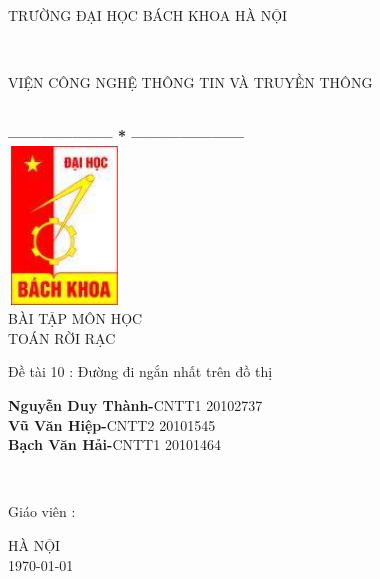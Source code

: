 \documentclass[a4paper,12pt]{report}
\begin{document}
	\thispagestyle{empty}
	\thisfancypage{
		\setlength{\fboxsep}{0pt}
		\fbox}{} 
	\begin{center}
		\begin{large}
			\textcolor[rgb]{1.00,0.00,0.00}{TRƯỜNG ĐẠI HỌC BÁCH KHOA HÀ NỘI}
		\end{large} \\
		\begin{large}
			\textcolor[rgb]{1.00,0.00,0.00}{VIỆN CÔNG NGHỆ THÔNG TIN VÀ TRUYỀN THÔNG}
		\end{large} \\
	
		\textbf{--------------------  *  ---------------------}\\[2cm]
	
		\includegraphics[width=3cm, height=4.2cm]{logo}\\[1cm]
		{\fontsize{32pt}{1}\selectfont BÀI TẬP MÔN HỌC}\\
		{\fontsize{20pt}{1}\selectfont TOÁN RỜI RẠC}\\[2cm]
	\end{center}
	
	\hspace{5cm}  Đề tài 10 : Đường đi ngắn nhất trên đồ thị
	\begin{flushright}
		\parbox[t]{8cm}{
		\textbf{Nguyễn Duy Thành-}CNTT1 20102737\\
		\textbf{Vũ Văn Hiệp-}CNTT2 20101545\\
		\textbf{Bạch Văn Hải-}CNTT1 20101464}\\[12pt]
	\end{flushright}
	
	\hspace{5cm} Giáo viên\hspace{24pt} :
	\begin{flushright} \textbf{\parbox[t]{8cm}{    
		\textcolor[rgb]{0.00,0.00,1.00}{Huỳnh Thanh Bình}
		}}
	\end{flushright}
	\vspace{2cm}
	\begin{center}
		{\fontsize{16pt}{1}\selectfont HÀ NỘI}\\
		{\fontsize{16pt}{1}\today}
	\end{center}
	
\end{document}
